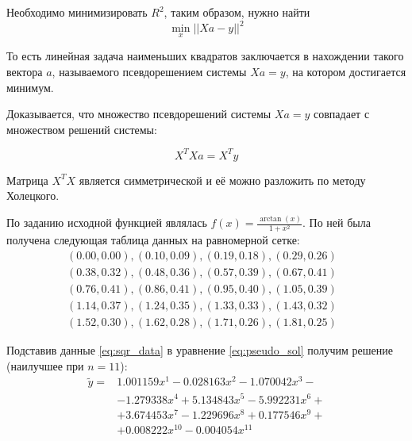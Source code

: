 \documentclass[a4paper, fontsize=14pt]{article}
\begin{document}
Необходимо минимизировать $R^2$, таким образом, нужно найти
\begin{equation*}
    \min_x || Xa - y ||^2
\end{equation*}

То есть линейная задача наименьших квадратов заключается
в нахождении такого вектора $a$, называемого псевдорешением
системы $Xa = y$, на котором достигается минимум.

Доказывается, что множество псевдорешений системы $Xa = y$ совпадает с множеством решений системы:

\begin{equation}
    \label{eq:pseudo_sol}
    X^T X a = X^T y
\end{equation}

Матрица $X^T X$ является симметрической и её можно разложить по методу Холецкого.

По заданию исходной функцией являлась $f(x) = \frac{\operatorname{arctan}(x)}{1 + x^2}$. По ней была получена следующая таблица данных на равномерной сетке:
\begin{equation}
    \label{eq:sqr_data}
    \begin{matrix}
        (0.00,0.00),(0.10,0.09),(0.19,0.18),(0.29,0.26)&\\
        (0.38,0.32),(0.48,0.36),(0.57,0.39),(0.67,0.41)&\\
        (0.76,0.41),(0.86,0.41),(0.95,0.40),(1.05,0.39)&\\
        (1.14,0.37),(1.24,0.35),(1.33,0.33),(1.43,0.32)&\\
        (1.52,0.30),(1.62,0.28),(1.71,0.26),(1.81,0.25)&
    \end{matrix}
\end{equation}

Подставив данные \eqref{eq:sqr_data} в уравнение \eqref{eq:pseudo_sol} получим решение (наилучшее при $n=11$):
\begin{equation}
    \label{eq:sqr_sol}
    \begin{aligned}
        \tilde{y} = &1.001159x^{1}-0.028163x^{2}-1.070042x^{3} -\\
        &-1.279338x^{4}+5.134843x^{5}-5.992231x^{6} +\\
        &+3.674453x^{7} -1.229696x^{8}+0.177546x^{9} +\\
        &+ 0.008222x^{10}-0.004054x^{11}
    \end{aligned}
\end{equation}
\end{document}
